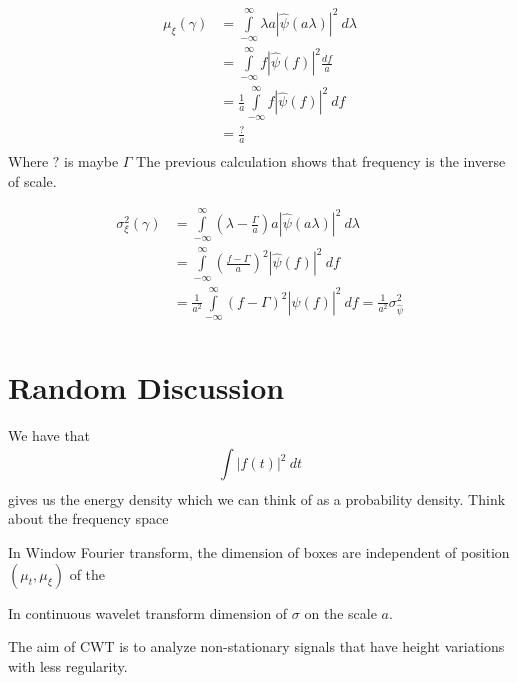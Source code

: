 \begin{align*}
    \mu_{\xi}(\gamma) &= \int\limits_{-\infty}^{\infty} \lambda a \left |
    \widehat{\psi}\left( a\lambda\right)  \right | ^2 \ d\lambda \\ 
                      &= \int\limits_{-\infty}^{\infty} f \left | \widehat{\psi} (f)
                      \right | ^2 \frac{ df }{ a }  \\ 
                       &= \frac{ 1 }{ a } \int\limits_{-\infty}^{\infty} f \left |
                       \widehat{\psi} (f)  \right | ^2 \ df  \\ 
                        &= \frac{ ?  }{ a }  \\ 
\end{align*}
Where $ ?   $ is maybe $ \Gamma $
The previous calculation shows that frequency is the inverse of scale. 

\begin{align*}
    \sigma _{ \xi }^{ 2 } (\gamma)  &= \int\limits_{-\infty}^{\infty} \left( \lambda -
    \frac{ \Gamma  }{ a } \right) a \left | \widehat{\psi} (a\lambda)  \right | ^2 \
    d\lambda  \\ 
     &= \int\limits_{-\infty}^{\infty} \left( \frac{ f - \Gamma }{ a } \right) ^2 \left |
     \widehat{\psi} (f)\right | ^2 \ df   \\ 
      &= \frac{ 1 }{ a^2 } \int\limits_{-\infty}^{\infty} \left( f - \Gamma\right) ^2
      \left | \widehat{\psi}(f) \right | ^2 \ df = \frac{ 1 }{ a^2  } \sigma _{
      \widehat{\psi} }^{ 2 }  \\ 
\end{align*}





\section{Random Discussion}
\label{sec:Random Discussion}
We have that
\[
\int\limits_{ }^{ } \left | f(t)  \right | ^2 \ dt  
\]
gives us the energy density which we can think of as a probability density. 
Think about the frequency space 

In Window Fourier transform, the dimension of boxes are independent of position $ \left( \mu_t,
\mu_\xi \right)  $ of the 

In continuous wavelet transform 
dimension of $ \sigma  $ on the scale $ a $. 

The aim of CWT is to analyze non-stationary signals that have height variations with less
regularity. 
